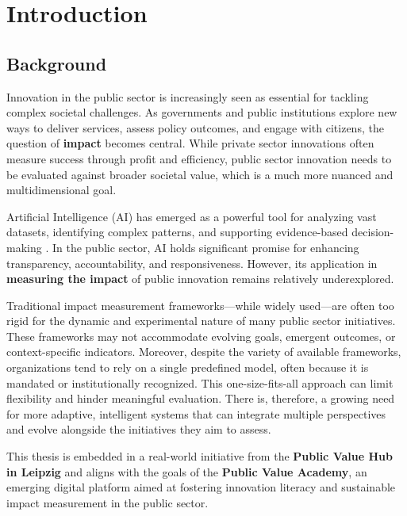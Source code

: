 
\chapter{Introduction}\label{ch:introduction}


\section{Background}\label{sec:background}

Innovation in the public sector is increasingly seen as essential for tackling complex societal challenges.
As governments and public institutions explore new ways to deliver services, assess policy outcomes, and engage with citizens, the question of \textbf{impact} becomes central.
While private sector innovations often measure success through profit and efficiency, public sector innovation needs to be evaluated against broader societal value, which is a much more nuanced and multidimensional goal.

Artificial Intelligence (AI) has emerged as a powerful tool for analyzing vast datasets, identifying complex patterns, and supporting evidence-based decision-making \parencite{russell2016artificial, marr2018data}.
In the public sector, AI holds significant promise for enhancing transparency, accountability, and responsiveness.
However, its application in \textbf{measuring the impact} of public innovation remains relatively underexplored.

Traditional impact measurement frameworks—while widely used—are often too rigid for the dynamic and experimental nature of many public sector initiatives.
These frameworks may not accommodate evolving goals, emergent outcomes, or context-specific indicators.
Moreover, despite the variety of available frameworks, organizations tend to rely on a single predefined model, often because it is mandated or institutionally recognized.
This one-size-fits-all approach can limit flexibility and hinder meaningful evaluation.
There is, therefore, a growing need for more adaptive, intelligent systems that can integrate multiple perspectives and evolve alongside the initiatives they aim to assess.

This thesis is embedded in a real-world initiative from the \textbf{Public Value Hub in Leipzig} and aligns with the goals of the \textbf{Public Value Academy}, an emerging digital platform aimed at fostering innovation literacy and sustainable impact measurement in the public sector.

